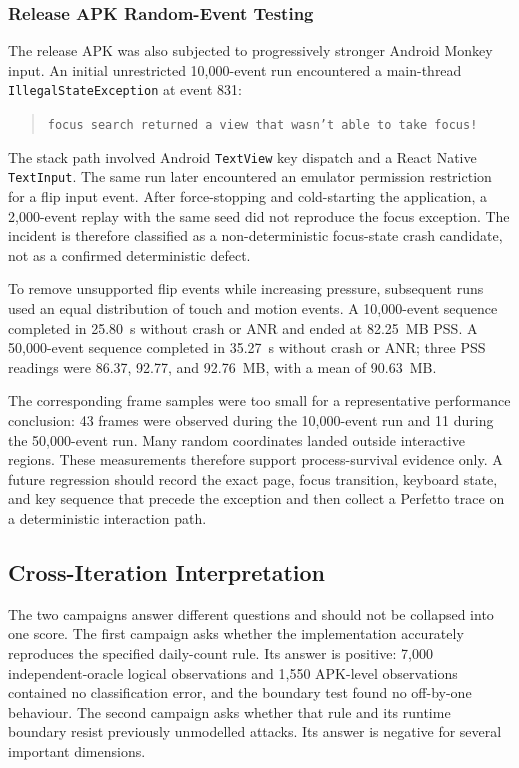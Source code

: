 \subsubsection{Release APK Random-Event Testing}

The release APK was also subjected to progressively stronger Android Monkey input. An initial unrestricted 10,000-event run encountered a main-thread
\texttt{IllegalStateException} at event 831:

\begin{quote}
\texttt{focus search returned a view that wasn't able to take focus!}
\end{quote}

The stack path involved Android \texttt{TextView} key dispatch and a React Native \texttt{TextInput}. The same run later encountered an emulator permission restriction for a flip input event. After force-stopping and cold-starting the application, a 2,000-event replay with the same seed did not reproduce the focus exception. The incident is therefore classified as a non-deterministic focus-state crash candidate, not as a confirmed deterministic defect.

To remove unsupported flip events while increasing pressure, subsequent runs used an equal distribution of touch and motion events. A 10,000-event sequence completed in 25.80~s without crash or ANR and ended at 82.25~MB PSS. A 50,000-event sequence completed in 35.27~s without crash or ANR; three PSS readings were 86.37, 92.77, and 92.76~MB, with a mean of 90.63~MB.

The corresponding frame samples were too small for a representative performance conclusion: 43 frames were observed during the 10,000-event run and 11 during the 50,000-event run. Many random coordinates landed outside interactive regions. These measurements therefore support process-survival evidence only. A future regression should record the exact page, focus transition, keyboard state, and key sequence that precede the exception and then collect a Perfetto trace on a deterministic interaction path.

\subsection{Cross-Iteration Interpretation}

The two campaigns answer different questions and should not be collapsed into one score. The first campaign asks whether the implementation accurately reproduces the specified daily-count rule. Its answer is positive: 7,000 independent-oracle logical observations and 1,550 APK-level observations contained no classification error, and the boundary test found no off-by-one behaviour. The second campaign asks whether that rule and its runtime boundary resist previously unmodelled attacks. Its answer is negative for several important dimensions.

